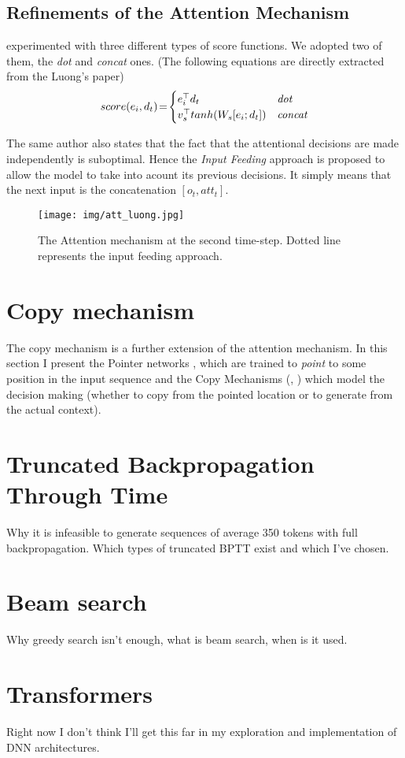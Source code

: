 \subsection{Refinements of the Attention Mechanism}
\citep{luong2015effective} experimented with three different types of score functions. We adopted two of them, the \emph{dot} and \emph{concat} ones. (The following equations are directly extracted from the Luong's paper)
\begin{equation*}
score(e_i, d_t)\!=\!\begin{cases}
    e_i^\top d_t & \mbox{{\it dot}}\\
    v_s^\top tanh(W_s[e_i ; d_t]) & \mbox{{\it concat}}
\end{cases}
\end{equation*}

The same author also states that the fact that the attentional decisions are made independently is suboptimal. Hence the \emph{Input Feeding} approach is proposed to allow the model to take into acount its previous decisions. It simply means that the next input is the concatenation $[o_t, att_t]$.

\begin{figure}[!h]
    \centering
    \texttt{[image: img/att\_luong.jpg]}
    \caption{\centering The Attention mechanism at the second time-step. Dotted line represents the input feeding approach.}
\end{figure}


\section{Copy mechanism}
The copy mechanism is a further extension of the attention mechanism. In this section I present the Pointer networks \citep{vinyals2015pointer}, which are trained to \emph{point} to some position in the input sequence and the Copy Mechanisms (\citep{gulcehre2016pointing}, \citep{gu2016incorporating}) which model the decision making (whether to copy from the pointed location or to generate from the actual context).

\section{Truncated Backpropagation Through Time}
Why it is infeasible to generate sequences of average 350 tokens with full backpropagation. Which types of truncated BPTT exist and which I've chosen.

\section{Beam search}
Why greedy search isn't enough, what is beam search, when is it used.

\section{Transformers}
Right now I don't think I'll get this far in my exploration and implementation of DNN architectures.
